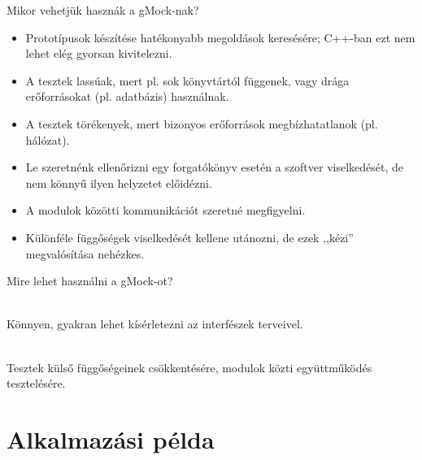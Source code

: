 \documentclass[usenames,dvipsnames,aspectratio=169]{beamer}
\begin{document}
\begin{frame}
    Mikor vehetjük hasznák a gMock-nak?
    \begin{itemize}
        \item Prototípusok készítése hatékonyabb megoldások keresésére; C++-ban ezt nem lehet elég gyorsan kivitelezni.
        \item A tesztek lassúak, mert pl. sok könyvtártól függenek, vagy drága erőforrásokat (pl. adatbázis) használnak.
        \item A tesztek törékenyek, mert bizonyos erőforrások megbízhatatlanok (pl. hálózat).
        \item Le szeretnénk ellenőrizni egy forgatókönyv esetén a szoftver viselkedését, de nem könnyű ilyen helyzetet előidézni.
        \item A modulok közötti kommunikációt szeretné megfigyelni.
        \item Különféle függőségek viselkedését kellene utánozni, de ezek ,,kézi'' megvalósítása nehézkes.
    \end{itemize}
\end{frame}

\begin{frame}
    Mire lehet használni a gMock-ot?
    \begin{description}[mm]
        \item[Tervezési segédeszközként] \hfill\\ Könnyen, gyakran lehet kísérletezni az interfészek terveivel.
        \item[Tesztelési segédeszközként] \hfill\\ Tesztek külső függőségeinek csökkentésére, modulok közti együttműködés tesztelésére.
    \end{description}
\end{frame}

\section{Alkalmazási példa}
\end{document}
